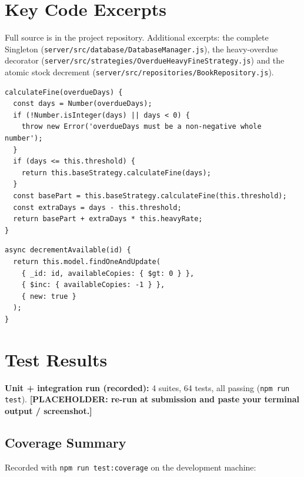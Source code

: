 \documentclass[12pt,a4paper]{article}
\newcommand{\placeholder}[1]{\textbf{[PLACEHOLDER: #1]}}
\begin{document}
\appendix
\section{Key Code Excerpts}
\label{app:code}
Full source is in the project repository. Additional excerpts: the complete
Singleton (\texttt{server/src/database/DatabaseManager.js}), the heavy-overdue
decorator (\texttt{server/src/strategies/OverdueHeavyFineStrategy.js}) and
the atomic stock decrement (\texttt{server/src/repositories/BookRepository.js}).

\begin{lstlisting}[caption={Heavy-overdue decorator (core)},label=lst:heavy]
calculateFine(overdueDays) {
  const days = Number(overdueDays);
  if (!Number.isInteger(days) || days < 0) {
    throw new Error('overdueDays must be a non-negative whole number');
  }
  if (days <= this.threshold) {
    return this.baseStrategy.calculateFine(days);
  }
  const basePart = this.baseStrategy.calculateFine(this.threshold);
  const extraDays = days - this.threshold;
  return basePart + extraDays * this.heavyRate;
}
\end{lstlisting}

\begin{lstlisting}[caption={Atomic availability decrement},label=lst:atomic]
async decrementAvailable(id) {
  return this.model.findOneAndUpdate(
    { _id: id, availableCopies: { $gt: 0 } },
    { $inc: { availableCopies: -1 } },
    { new: true }
  );
}
\end{lstlisting}

\section{Test Results}
\label{app:tests}
\textbf{Unit + integration run (recorded):} 4 suites, 64 tests, all passing
(\texttt{npm run test}).
\placeholder{re-run at submission and paste your terminal output / screenshot.}

\subsection{Coverage Summary}
\label{app:coverage}
Recorded with \texttt{npm run test:coverage} on the development machine:
\end{document}
